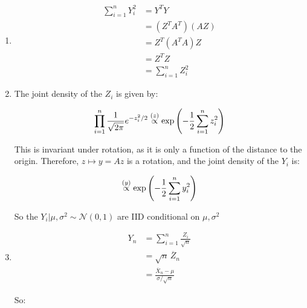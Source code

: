 \documentclass[a4paper]{article}
\begin{document}
                    \begin{enumerate}
                        \item
                            \begin{align*}
                                \sum_{i=1}^n Y_i^2 & = Y^TY \\
                                & = (Z^TA^T)(AZ) \\
                                & = Z^T(A^TA)Z \\
                                & = Z^TZ \\
                                & = \sum_{i=1}^n Z_i^2
                            \end{align*}

                        \item The joint density of the $Z_i$ is given by:

                            \[
                                \prod_{i=1}^n \frac{1}{\sqrt{2\pi}} e^{-z_i^2/2}
                                \stackrel{({z})}{\propto} \exp\left(-\frac{1}{2} \sum_{i=1}^n
                                z_i^2\right)
                            \]

                            This is invariant under rotation, as it is only a
                            function of the distance to the origin. Therefore,
                            $z \mapsto y = Az$ is a rotation, and the joint
                            density of the $Y_i$ is:

                            \[
                                \stackrel{({y})}{\propto} \exp\left(-\frac{1}{2} \sum_{i=1}^n
                                y_i^2\right)
                            \]

                            So the $Y_i | \mu, \sigma^2 \sim \mathcal{N}(0, 1)$
                            are IID conditional on $\mu, \sigma^2$

                        \item
                            \begin{align*}
                                Y_n & = \sum_{i=1}^n \frac{Z_i}{\sqrt{n}} \\
                                & = \sqrt{n}\,\overline Z_n \\
                                & = \frac{\overline X_n - \mu}{\sigma/\sqrt{n}}
                            \end{align*}

                            So:


\end{enumerate}
\end{document}
